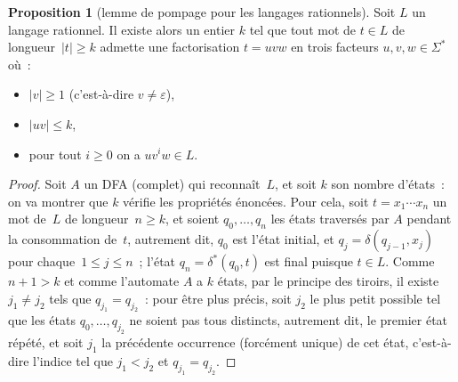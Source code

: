 \documentclass[12pt,a4paper]{article}
\theoremstyle{definition}
\newtheorem{prop}[comcnt]{Proposition}
\begin{document}
\begin{prop}[lemme de pompage pour les langages rationnels]\label{pumping-lemma}
Soit $L$ un langage rationnel.  Il existe alors un entier $k$ tel que
tout mot de $t \in L$ de longueur $|t| \geq k$ admette une
factorisation $t = uvw$ en trois facteurs $u,v,w \in \Sigma^*$ où :
\begin{itemize}
\item[(i)] $|v| \geq 1$ (c'est-à-dire $v\neq\varepsilon$),
\item[(ii)] $|uv| \leq k$,
\item[(iii)] pour tout $i\geq 0$ on a $uv^iw \in L$.
\end{itemize}
\end{prop}
\begin{proof}
Soit $A$ un DFA (complet) qui reconnaît $L$, et soit $k$ son nombre
d'états : on va montrer que $k$ vérifie les propriétés énoncées.  Pour
cela, soit $t = x_1 \cdots x_n$ un mot de $L$ de longueur $n \geq k$,
et soient $q_0,\ldots,q_n$ les états traversés par $A$ pendant la
consommation de $t$, autrement dit, $q_0$ est l'état initial, et $q_j
= \delta(q_{j-1}, x_j)$ pour chaque $1\leq j\leq n$ ; l'état $q_n =
\delta^*(q_0, t)$ est final puisque $t \in L$.  Comme $n+1 > k$ et
comme l'automate $A$ a $k$ états, par le principe des tiroirs, il
existe $j_1\neq j_2$ tels que $q_{j_1} = q_{j_2}$ : pour être plus
précis, soit $j_2$ le plus petit possible tel que les états
$q_0,\ldots,q_{j_2}$ ne soient pas tous distincts, autrement dit, le
premier état répété, et soit $j_1$ la précédente occurrence (forcément
unique) de cet état, c'est-à-dire l'indice tel que $j_1<j_2$ et
$q_{j_1} = q_{j_2}$.


\end{proof}
\end{document}
